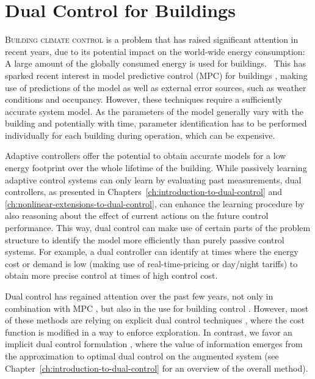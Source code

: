 \chapter{Dual Control for Buildings}
\label{ch:dual-control-for-buildings}

\lettrine{B}{uilding climate control}
is a problem that has raised significant attention in recent years, due to its
potential impact on the world-wide energy consumption: A large amount of the
globally consumed energy is used for buildings.~\cite{IEA:2008:Energy}\iss
This has sparked recent interest in model predictive control (MPC) for buildings
%
%
%
%
, making use of
predictions of the model as well as external error sources, such as weather
conditions and occupancy. However, these techniques require a sufficiently
accurate system model. As the parameters of the model generally vary with the
building and potentially with time, parameter identification has to be performed
individually for each building during operation, which can be expensive.

Adaptive controllers offer the potential to obtain accurate models for a low
energy footprint over the whole lifetime of the building. While passively
learning adaptive control systems can only learn by evaluating past
measurements, dual controllers, as presented in
Chapters~\ref{ch:introduction-to-dual-control} and
\ref{ch:nonlinear-extensions-to-dual-control}, can enhance the learning
procedure by also reasoning about the effect of current actions on the future
control performance. This way, dual control can make use of certain parts of
the problem structure to identify the model more efficiently than purely
passive control systems. For example, a dual controller can identify at times
where the energy cost or demand is low (making use of real-time-pricing or
day/night tariffs) to obtain more precise control at times of high control cost.

Dual control has regained attention over the past few years, not only in
combination with MPC \cite{Cheng.Haghighat.ea:2015:Robust}, but also in the use
for building control \cite{Zacekova.Privara.ea:2013:Dual}. However, most of
these methods are relying on explicit dual control techniques
\cite{Filatov.Unbehauen:2000:Survey}, where the cost function is modified in a
way to enforce exploration. In contrast, we favor an implicit dual control
formulation \cite{Tse.Bar-Shalom:1973:Actively}, where the value of information
emerges from the approximation to optimal dual control on the augmented system
(see Chapter~\ref{ch:introduction-to-dual-control} for an overview of the
overall method).

